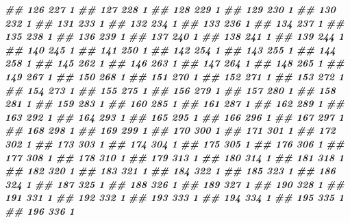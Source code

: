 \documentclass[
]{book}
\newenvironment{Shaded}{\begin{snugshade}}{\end{snugshade}}
\newcommand{\DocumentationTok}[1]{\textcolor[rgb]{0.56,0.35,0.01}{\textbf{\textit{#1}}}}
\theoremstyle{definition}
\theoremstyle{definition}
\theoremstyle{definition}
\theoremstyle{definition}
\theoremstyle{remark}
\begin{document}
\begin{Shaded}
\begin{Highlighting}[]
\DocumentationTok{\#\# 126    227 1}
\DocumentationTok{\#\# 127    228 1}
\DocumentationTok{\#\# 128    229 1}
\DocumentationTok{\#\# 129    230 1}
\DocumentationTok{\#\# 130    232 1}
\DocumentationTok{\#\# 131    233 1}
\DocumentationTok{\#\# 132    234 1}
\DocumentationTok{\#\# 133    236 1}
\DocumentationTok{\#\# 134    237 1}
\DocumentationTok{\#\# 135    238 1}
\DocumentationTok{\#\# 136    239 1}
\DocumentationTok{\#\# 137    240 1}
\DocumentationTok{\#\# 138    241 1}
\DocumentationTok{\#\# 139    244 1}
\DocumentationTok{\#\# 140    245 1}
\DocumentationTok{\#\# 141    250 1}
\DocumentationTok{\#\# 142    254 1}
\DocumentationTok{\#\# 143    255 1}
\DocumentationTok{\#\# 144    258 1}
\DocumentationTok{\#\# 145    262 1}
\DocumentationTok{\#\# 146    263 1}
\DocumentationTok{\#\# 147    264 1}
\DocumentationTok{\#\# 148    265 1}
\DocumentationTok{\#\# 149    267 1}
\DocumentationTok{\#\# 150    268 1}
\DocumentationTok{\#\# 151    270 1}
\DocumentationTok{\#\# 152    271 1}
\DocumentationTok{\#\# 153    272 1}
\DocumentationTok{\#\# 154    273 1}
\DocumentationTok{\#\# 155    275 1}
\DocumentationTok{\#\# 156    279 1}
\DocumentationTok{\#\# 157    280 1}
\DocumentationTok{\#\# 158    281 1}
\DocumentationTok{\#\# 159    283 1}
\DocumentationTok{\#\# 160    285 1}
\DocumentationTok{\#\# 161    287 1}
\DocumentationTok{\#\# 162    289 1}
\DocumentationTok{\#\# 163    292 1}
\DocumentationTok{\#\# 164    293 1}
\DocumentationTok{\#\# 165    295 1}
\DocumentationTok{\#\# 166    296 1}
\DocumentationTok{\#\# 167    297 1}
\DocumentationTok{\#\# 168    298 1}
\DocumentationTok{\#\# 169    299 1}
\DocumentationTok{\#\# 170    300 1}
\DocumentationTok{\#\# 171    301 1}
\DocumentationTok{\#\# 172    302 1}
\DocumentationTok{\#\# 173    303 1}
\DocumentationTok{\#\# 174    304 1}
\DocumentationTok{\#\# 175    305 1}
\DocumentationTok{\#\# 176    306 1}
\DocumentationTok{\#\# 177    308 1}
\DocumentationTok{\#\# 178    310 1}
\DocumentationTok{\#\# 179    313 1}
\DocumentationTok{\#\# 180    314 1}
\DocumentationTok{\#\# 181    318 1}
\DocumentationTok{\#\# 182    320 1}
\DocumentationTok{\#\# 183    321 1}
\DocumentationTok{\#\# 184    322 1}
\DocumentationTok{\#\# 185    323 1}
\DocumentationTok{\#\# 186    324 1}
\DocumentationTok{\#\# 187    325 1}
\DocumentationTok{\#\# 188    326 1}
\DocumentationTok{\#\# 189    327 1}
\DocumentationTok{\#\# 190    328 1}
\DocumentationTok{\#\# 191    331 1}
\DocumentationTok{\#\# 192    332 1}
\DocumentationTok{\#\# 193    333 1}
\DocumentationTok{\#\# 194    334 1}
\DocumentationTok{\#\# 195    335 1}
\DocumentationTok{\#\# 196    336 1}

\end{Highlighting}
\end{Shaded}
\end{document}
